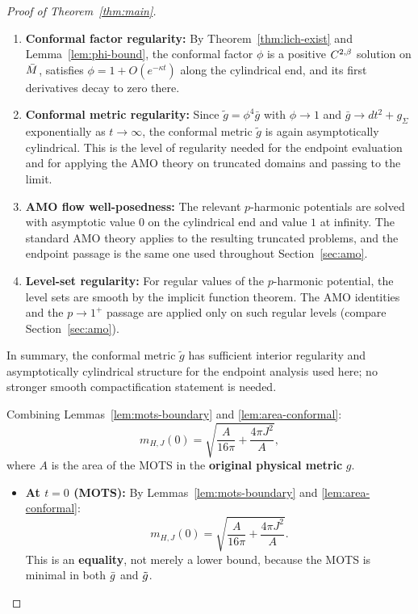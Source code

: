 \begin{proof}[Proof of Theorem~\ref{thm:main}]
\begin{remark}
\begin{enumerate}
    \item \textbf{Conformal factor regularity:} By Theorem~\ref{thm:lich-exist} and Lemma~\ref{lem:phi-bound}, the conformal factor $\phi$ is a positive $C^{2,\beta}$ solution on $\bar{M}$, satisfies $\phi = 1 + O(e^{-\kappa t})$ along the cylindrical end, and its first derivatives decay to zero there.
    
    \item \textbf{Conformal metric regularity:} Since $\tilde{g} = \phi^4 \bar{g}$ with $\phi \to 1$ and $\bar{g} \to dt^2 + g_\Sigma$ exponentially as $t \to \infty$, the conformal metric $\tilde{g}$ is again asymptotically cylindrical. This is the level of regularity needed for the endpoint evaluation and for applying the AMO theory on truncated domains and passing to the limit.
    
    \item \textbf{AMO flow well-posedness:} The relevant $p$-harmonic potentials are solved with asymptotic value $0$ on the cylindrical end and value $1$ at infinity. The standard AMO theory applies to the resulting truncated problems, and the endpoint passage is the same one used throughout Section~\ref{sec:amo}.
    
    \item \textbf{Level-set regularity:} For regular values of the $p$-harmonic potential, the level sets are smooth by the implicit function theorem. The AMO identities and the $p\to1^+$ passage are applied only on such regular levels (compare Section~\ref{sec:amo}).
\end{enumerate}
In summary, the conformal metric $\tilde{g}$ has sufficient interior regularity and asymptotically cylindrical structure for the endpoint analysis used here; no stronger smooth compactification statement is needed.
\end{remark}

Combining Lemmas~\ref{lem:mots-boundary} and \ref{lem:area-conformal}:
\[
m_{H,J}(0) = \sqrt{\frac{A}{16\pi} + \frac{4\pi J^2}{A}},
\]
where $A$ is the area of the MOTS in the \textbf{original physical metric} $g$.

\begin{itemize}
    \item \textbf{At $t = 0$ (MOTS):} By Lemmas~\ref{lem:mots-boundary} and \ref{lem:area-conformal}:
    \[
    m_{H,J}(0) = \sqrt{\frac{A}{16\pi} + \frac{4\pi J^2}{A}}.
    \]
    This is an \textbf{equality}, not merely a lower bound, because the MOTS is minimal in both $\bar{g}$ and $\tilde{g}$.
    

\end{itemize}
\end{proof}
